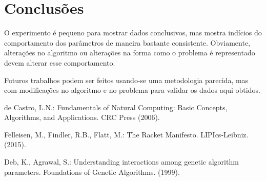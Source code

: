 \documentclass{llncs}
\begin{document}
\section{Conclusões}
%
O experimento é pequeno para mostrar dados conclusivos, mas mostra indícios do comportamento dos parâmetros de maneira bastante consistente. Obviamente, alterações no algoritmo ou alterações na forma como o problema é representado devem alterar esse comportamento.

Futuros trabalhos podem ser feitos usando-se uma metodologia parecida, mas com modificações no algoritmo e no problema para validar os dados aqui obtidos.

%
%
\begin{thebibliography}{5}
%

de Castro, L.N.: Fundamentals of Natural Computing: Basic Concepts, Algorithms, and Applications. CRC Press (2006).

Felleisen, M., Findler, R.B., Flatt, M.: The Racket Manifesto. LIPIcs-Leibniz. (2015).

Deb, K., Agrawal, S.: Understanding interactions among genetic algorithm parameters. Foundations of Genetic Algorithms. (1999).

\end{thebibliography}
\end{document}
